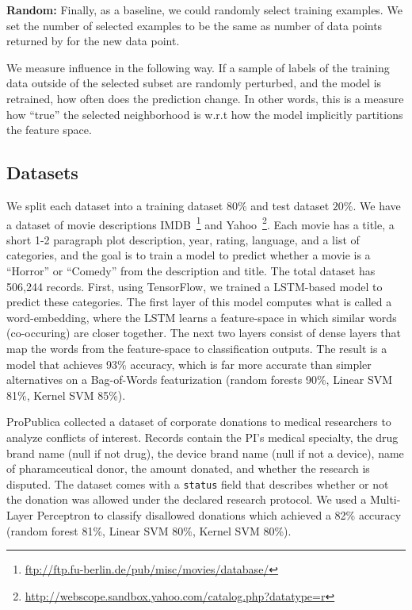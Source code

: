 \vspace{0.25em} \noindent \textbf{Random: } Finally, as a baseline, we could randomly select training examples.  We set the number of selected examples to be the same as number of data points returned by \sys for the new data point.

\noindent \vspace{0.5em} We measure influence in the following way.
If a sample of labels of the training data outside of the selected subset are randomly perturbed, and the model is retrained, how often does the prediction change. In other words, this is a measure how ``true'' the selected neighborhood is w.r.t how the model implicitly partitions the feature space.

\subsection{Datasets}
We split each dataset into a training dataset $80\%$ and test dataset $20\%$. 
 We have a dataset of movie descriptions IMDB~\footnote{ \url{ftp://ftp.fu-berlin.de/pub/misc/movies/database/}} and Yahoo~\footnote{ \url{http://webscope.sandbox.yahoo.com/catalog.php?datatype=r}}.
Each movie has a title, a short 1-2 paragraph plot description, year, rating, language, and a list of categories, and the goal is to train a model to predict whether a movie is a ``Horror'' or ``Comedy'' from the description and title.  
The total dataset has 506,244 records.
First, using TensorFlow, we trained a LSTM-based model to predict these categories. The first layer of this model computes what is called a word-embedding, where the LSTM learns a feature-space in which similar words (co-occuring) are closer together. 
The next two layers consist of dense layers that map the words from the feature-space to classification outputs.
The result is a model that achieves 93\% accuracy, which is far more accurate than simpler alternatives on a Bag-of-Words featurization (random forests 90\%, Linear SVM 81\%, Kernel SVM 85\%).

 ProPublica collected a dataset of corporate donations to medical researchers to analyze conflicts of interest. 
Records contain the PI's medical specialty, the drug brand name (null if not drug), the device brand name (null if not a device), name of pharamceutical donor, the amount donated, and whether the research is disputed.
The dataset comes with a \texttt{status} field that describes whether or not the donation was allowed under the declared research protocol.
We used a Multi-Layer Perceptron to classify disallowed donations which achieved a 82\% accuracy (random forest 81\%, Linear SVM 80\%, Kernel SVM 80\%).


